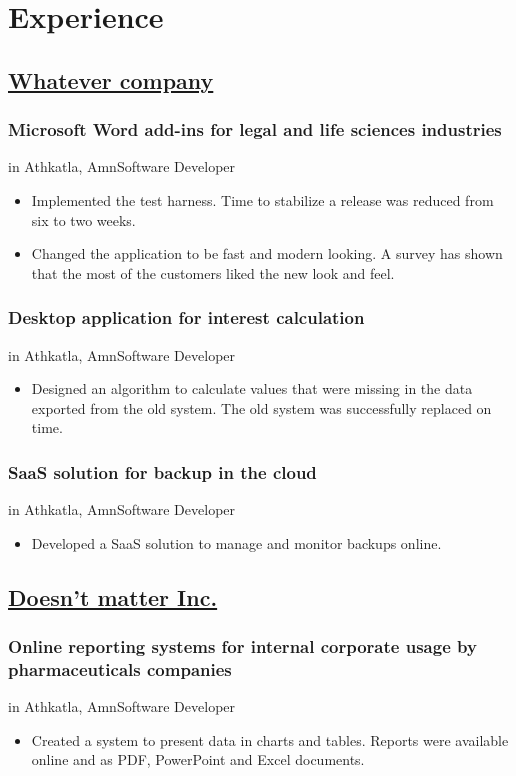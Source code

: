 \documentclass[a4paper,11pt]{article}
\newcommand{\periodinminsk}[1]{{\footnotesize #1 in Athkatla, Amn}}
\newcommand{\jobattributes}[1]{\periodinminsk{#1}{\footnotesize \newline Software Developer}}
\begin{document}
  \begin{minipage}[t]{0.55\textwidth}
    \section*{Experience}
    \subsection*{\href{http://www.whatevercompany.com/}{Whatever company}}
    \subsubsection*{Microsoft Word add-ins for legal and life sciences industries}
    \jobattributes{}
    \begin{itemize}
      \item Implemented the test harness. Time to stabilize a release was reduced from six to two weeks.
      \item Changed the application to be fast and modern looking. A survey has shown that the most of the customers liked the new look and feel.
    \end{itemize}
    \subsubsection*{Desktop application for interest calculation}
    \jobattributes{}
    \begin{itemize}
      \item Designed an algorithm to calculate values that were missing in the data exported from the old system. The old system was successfully replaced on time.
    \end{itemize}
    \subsubsection*{SaaS solution for backup in the cloud}
    \jobattributes{}
    \begin{itemize}
      \item Developed a SaaS solution to manage and monitor backups online.
    \end{itemize}
    \subsection*{\href{http://www.doesntmatterinc.com/}{Doesn't matter Inc.}}
    \subsubsection*{Online reporting systems for internal corporate usage by pharmaceuticals companies}
    \jobattributes{}
    \begin{itemize}
      \item Created a system to present data in charts and tables. Reports were available online and as PDF, PowerPoint and Excel documents.
    \end{itemize}
  \end{minipage}
\end{document}

